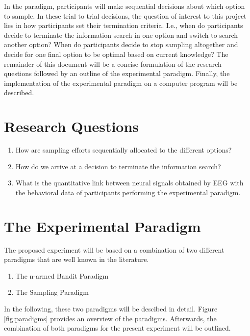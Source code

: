 \documentclass[
	12pt,
	oneside,
	bibliography=totocnumbered]{scrartcl}
\begin{document}
In the paradigm, participants will make sequential decisions about which option to sample. In these trial to trial decisions, the question of interest to this project lies in how participants set their termination criteria. I.e., when do participants decide to terminate the information search in one option and switch to search another option? When do participants decide to stop sampling altogether and decide for one final option to be optimal based on current knowledge? The remainder of this document will be a concise formulation of the research questions followed by an outline of the experimental paradigm. Finally, the implementation of the experimental paradigm on a computer program will be described.


\section{Research Questions}

\begin{enumerate}
\item How are sampling efforts sequentially allocated to the different options?
\item How do we arrive at a decision to terminate the information search?
\item What is the quantitative link between neural signals obtained by EEG with the behavioral data of participants performing the experimental paradigm.
\end{enumerate}



\section{The Experimental Paradigm}
The proposed experiment will be based on a combination  of two different paradigms that are well known in the literature.

\begin{enumerate}
\item The n-armed Bandit Paradigm
\item The Sampling Paradigm
\end{enumerate}

In the following, these two paradigms will be descibed in detail. Figure \ref{fig:paradigms} provides an overview of the paradigms. Afterwards, the combination of both paradigms for the present experiment will be outlined.


\end{document}
